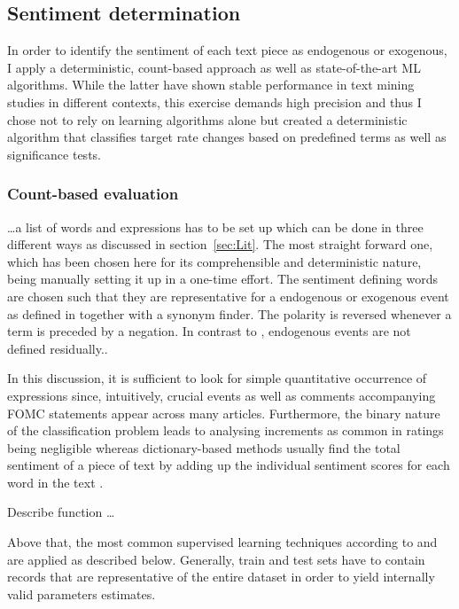 %
\subsection{Sentiment determination}

In order to identify the sentiment of each text piece as endogenous or exogenous, I apply a deterministic, count-based approach as well as state-of-the-art ML algorithms. While the latter have shown stable performance in text mining studies in different contexts, this exercise demands high precision and thus I chose not to rely on learning algorithms alone but created a deterministic algorithm that classifies target rate changes based on predefined terms as well as significance tests.

%
\subsubsection{Count-based evaluation}

\dots a list of words and expressions has to be set up which can be done in three different ways as discussed in section~\ref{sec:Lit}. The most straight forward one, which has been chosen here for its comprehensible and deterministic nature, being manually setting it up in a one-time effort. The sentiment defining words are chosen such that they are representative for a endogenous or exogenous event as defined in \textcite{Ellingsen.2003} together with a synonym finder. The polarity is reversed whenever a term is preceded by a negation. In contrast to \textcite{Ellingsen.2003}, endogenous events are not defined residually..

In this discussion, it is sufficient to look for simple quantitative occurrence of expressions since, intuitively, crucial events as well as comments accompanying FOMC statements appear across many articles. Furthermore, the binary nature of the classification problem leads to analysing increments as common in ratings being negligible whereas dictionary-based methods usually find the total sentiment of a piece of text by adding up the individual sentiment scores for each word in the text \parencite{Silge.2017}. 

Describe function \dots

%
Above that, the most common supervised learning techniques according to \textcite{Liu.2010} and \textcite{Feldman.2013} are applied as described below. Generally, train and test sets have to contain records that are representative of the entire dataset in order to yield internally valid parameters estimates. 

